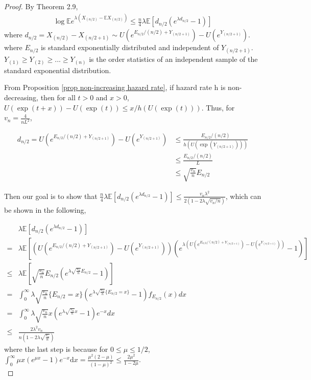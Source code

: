 \documentclass{article}
\theoremstyle{plain}
\begin{document}
\begin{proof}
By \cite{boucheron2012} Theorem 2.9,
\begin{align}
    \log \mathbb{E} e^{\lambda\left(X_{(n / 2)}-\mathbb{E} X_{(n / 2)}\right)} \leq \frac{n}{4} \lambda \mathbb{E}\left[d_{n / 2}\left(e^{\lambda d_{n / 2}}-1\right)\right]
\end{align}
where $d_{n / 2}=X_{(n / 2)}-X_{(n / 2+1)} \sim U\left(e^{E_{n / 2} /(n / 2)+Y_{(n / 2+1)}} \right)-U\left(e^{Y_{(n / 2+1)}}\right).$ where $E_{n/2}$ is standard exponentially distributed and independent of $Y_{(n/2 + 1)}$. $Y_{(1)} \geq Y_{(2)} \geq ... \geq Y_{(n)}$ is the order statistics of an independent sample of the standard exponential distribution.

From Proposition \ref{prop non-increasing hazard rate}, if hazard rate h is non-decreasing, then for all $t > 0$ and $x > 0$, $U(\exp (t+x))-U(\exp (t)) \leq x / h(U(\exp (t)))$. Thus, for $v_n = \frac{4}{n L^2}$,

\begin{align}
    d_{n/2} = U\left(e^{E_{n / 2} /(n / 2)+Y_{(n / 2+1)}} \right)-U\left(e^{Y_{(n / 2+1)}}\right)
    & \leq \frac{E_{n / 2} /(n / 2)}{h(U(\exp{(Y_{(n/2+1)})}))}\\
    &\leq \frac{E_{n / 2} /(n / 2)}{L}\\
    & \leq \sqrt{\frac{v_n}{n}} E_{n/2}
\end{align}

Then our goal is to show that $\frac{n}{4} \lambda \mathbb{E}\left[d_{n / 2}\left(e^{\lambda d_{n / 2}}-1\right)\right] \leq \frac{v_{n} \lambda^{2}}{2\left(1-2 \lambda \sqrt{v_{n} / n}\right)}$, which can be shown in the following,

\begin{align}
    & \lambda \mathbb{E}\left[d_{n / 2}\left(e^{\lambda d_{n / 2}}-1\right)\right] \\
    = &  \lambda \mathbb{E}[\left(U\left(e^{E_{n / 2} /(n / 2)+Y_{(n / 2+1)}} \right)-U\left(e^{Y_{(n / 2+1)}}\right) \right) \left(e^{\lambda \left (U\left(e^{E_{n / 2} /(n / 2)+Y_{(n / 2+1)}} \right)-U\left(e^{Y_{(n / 2+1)}}\right) \right)} - 1\right)]\\
    \leq &  \lambda \mathbb{E}[\sqrt{\frac{v_{n}}{n}} E_{n / 2} \left(e^{\lambda \sqrt{\frac{v_{n}}{n}} E_{n / 2}} -1\right)]\\
    = &  \int_0^\infty \lambda  \sqrt{\frac{v_{n}}{n}} \{ E_{n / 2}  = x \} \left(e^{\lambda \sqrt{\frac{v_{n}}{n}} \{E_{n / 2} = x\}} -1\right) f_{E_{n/2}}(x) d x\\
    =  & \int_0^\infty \lambda  \sqrt{\frac{v_{n}}{n}} x \left(e^{\lambda \sqrt{\frac{v_{n}}{n}} x } -1\right) e^{-x} d x\\
    \leq &  \frac{2\lambda^2 v_n}{n (1 - 2 \lambda \sqrt{\frac{v_n}{n}})}
\end{align}
where the last step is because for $0 \leq \mu \leq 1/2$, $\int_{0}^{\infty} \mu x\left(e^{\mu x}-1\right) e^{-x} \mathrm{d} x=\frac{\mu^{2}(2-\mu)}{(1-\mu)^{2}} \leq \frac{2 \mu^{2}}{1-2 \mu}$.\\


\end{proof}
\end{document}
